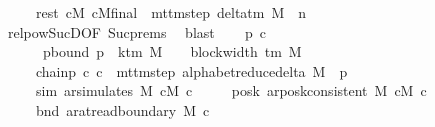 \begin{isabellebody}
\ \ \ \ \ rest{\isacharcolon}{\kern0pt}\ {\isachardoublequoteopen}{\isacharparenleft}{\kern0pt}cM{\isacharunderscore}{\kern0pt}{}{\isacharcomma}{\kern0pt}\ cM{\isacharunderscore}{\kern0pt}final{\isacharparenright}{\kern0pt}\ {\isasymin}\ mttm{\isacharunderscore}{\kern0pt}step\ {\isacharparenleft}{\kern0pt}delta{\isacharunderscore}{\kern0pt}tm\ M{\isacharparenright}{\kern0pt}\ {\isacharcircum}{\kern0pt}{\isacharcircum}{\kern0pt}\ n{\isacharprime}{\kern0pt}{\isachardoublequoteclose}\isanewline
\ \ \ \ \isamarkupfalse%
\ relpow{\isacharunderscore}{\kern0pt}Suc{\isacharunderscore}{\kern0pt}D{}{\isacharbrackleft}{\kern0pt}OF\ Suc{\isachardot}{\kern0pt}prems{\isacharparenleft}{\kern0pt}{}{\isacharparenright}{\kern0pt}{\isacharbrackright}{\kern0pt}\ \isamarkupfalse%
\ blast\isanewline
\ \ \isamarkupfalse%
\ p\ c{}\ \isanewline
\ \ \ \ \ \ pbound{\isacharcolon}{\kern0pt}\ {\isachardoublequoteopen}p\ {\isasymle}\ k{\isacharunderscore}{\kern0pt}tm\ M\ {\isacharasterisk}{\kern0pt}\ {\isacharparenleft}{\kern0pt}{}\ {\isacharasterisk}{\kern0pt}\ block{\isacharunderscore}{\kern0pt}width\ {\isacharparenleft}{\kern0pt}{\isasymGamma}{\isacharunderscore}{\kern0pt}tm\ M{\isacharparenright}{\kern0pt}\ {\isacharplus}{\kern0pt}\ {}{\isacharparenright}{\kern0pt}\ {\isacharplus}{\kern0pt}\ {}{\isachardoublequoteclose}\isanewline
\ \ \ \ \ chainp{\isacharcolon}{\kern0pt}\ {\isachardoublequoteopen}{\isacharparenleft}{\kern0pt}c{\isacharprime}{\kern0pt}{\isacharcomma}{\kern0pt}\ c{}{\isacharparenright}{\kern0pt}\ {\isasymin}\ mttm{\isacharunderscore}{\kern0pt}step\ {\isacharparenleft}{\kern0pt}alphabet{\isacharunderscore}{\kern0pt}reduce{\isacharunderscore}{\kern0pt}delta\ M{\isacharparenright}{\kern0pt}\ {\isacharcircum}{\kern0pt}{\isacharcircum}{\kern0pt}\ p{\isachardoublequoteclose}\isanewline
\ \ \ \ \ sim{}{\isacharcolon}{\kern0pt}\ {\isachardoublequoteopen}ar{\isacharunderscore}{\kern0pt}simulates\ M\ cM{\isacharunderscore}{\kern0pt}{}\ c{}{\isachardoublequoteclose}\isanewline
\ \ \ \ \ posk{}{\isacharcolon}{\kern0pt}\ {\isachardoublequoteopen}ar{\isacharunderscore}{\kern0pt}posk{\isacharunderscore}{\kern0pt}consistent\ M\ cM{\isacharunderscore}{\kern0pt}{}\ c{}{\isachardoublequoteclose}\isanewline
\ \ \ \ \ bnd{}{\isacharcolon}{\kern0pt}\ {\isachardoublequoteopen}ar{\isacharunderscore}{\kern0pt}at{\isacharunderscore}{\kern0pt}read{\isacharunderscore}{\kern0pt}boundary\ M\ c{}{\isachardoublequoteclose}\isanewline

\end{isabellebody}
